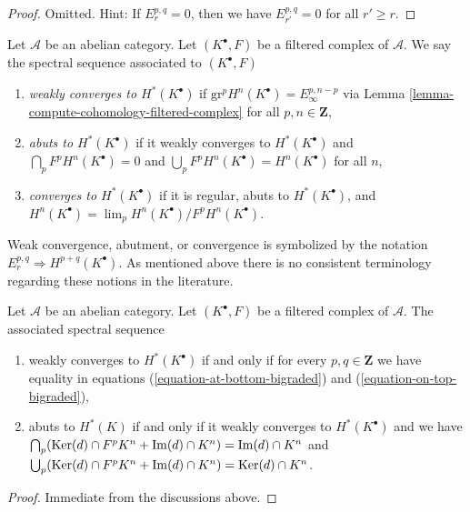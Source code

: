 \begin{proof}
Omitted. Hint: If $E_r^{p, q} = 0$, then we have $E_{r'}^{p, q} = 0$
for all $r' \geq r$.
\end{proof}

\begin{definition}
\label{definition-filtered-complex-ss-converges}
Let $\mathcal{A}$ be an abelian category. Let $(K^\bullet, F)$ be a
filtered complex of $\mathcal{A}$. We say the spectral sequence
associated to $(K^\bullet, F)$
\begin{enumerate}
\item {\it weakly converges to $H^*(K^\bullet)$} if
$\text{gr}^pH^n(K^\bullet) = E_{\infty}^{p, n - p}$
via Lemma \ref{lemma-compute-cohomology-filtered-complex}
for all $p, n \in \mathbf{Z}$,
\item {\it abuts to $H^*(K^\bullet)$} if it weakly converges to
$H^*(K^\bullet)$ and $\bigcap_p F^pH^n(K^\bullet) = 0$ and
$\bigcup_p F^p H^n(K^\bullet) = H^n(K^\bullet)$ for all $n$,
\item {\it converges to $H^*(K^\bullet)$} if it is regular,
abuts to $H^*(K^\bullet)$, and
$H^n(K^\bullet) = \lim_p H^n(K^\bullet)/F^pH^n(K^\bullet)$.
\end{enumerate}
\end{definition}

\noindent
Weak convergence, abutment, or convergence is symbolized by the notation
$E_r^{p, q} \Rightarrow H^{p + q}(K^\bullet)$.
As mentioned above there is no consistent terminology regarding
these notions in the literature.

\begin{lemma}
\label{lemma-filtered-complex-ss-converges}
Let $\mathcal{A}$ be an abelian category. Let $(K^\bullet, F)$ be a filtered
complex of $\mathcal{A}$. The associated spectral sequence
\begin{enumerate}
\item weakly converges to $H^*(K^\bullet)$ if and only if for every
$p, q \in \mathbf{Z}$ we have equality in equations
(\ref{equation-at-bottom-bigraded}) and (\ref{equation-on-top-bigraded}),
\item abuts to $H^*(K)$ if and only if it weakly converges to $H^*(K^\bullet)$
and we have
$\bigcap_p (\mathop{\mathrm{Ker}}(d) \cap F^pK^n + \mathop{\mathrm{Im}}(d) \cap K^n) = \mathop{\mathrm{Im}}(d) \cap K^n$
and
$\bigcup_p (\mathop{\mathrm{Ker}}(d) \cap F^pK^n + \mathop{\mathrm{Im}}(d) \cap K^n) = \mathop{\mathrm{Ker}}(d) \cap K^n$.
\end{enumerate}
\end{lemma}

\begin{proof}
Immediate from the discussions above.
\end{proof}

